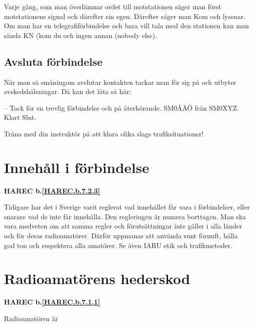Varje gång, som man överlämnar ordet till motstationen
säger man först motstationens signal och därefter sin egen. Därefter
säger man Kom och lyssnar. Om man har en telegrafiförbindelse och bara
vill tala med den stationen kan man sända KN (kom du och ingen annan
(nobody else).

\subsection{Avsluta förbindelse}

När man så småningom avslutar kontakten tackar man för sig på och
utbyter avskedshälsningar. Då kan det låta så här:

-- Tack för en trevlig förbindelse och på återhörande. SM0ÅÄÖ från
SM0XYZ. Klart Slut.

Träna med din instruktör på att klara olika slags trafiksituationer!

\section{Innehåll i förbindelse}
\textbf{HAREC
  b.\ref{HAREC.b.7.2.3}\label{myHAREC.b.7.2.3}
}

Tidigare har det i Sverige varit reglerat vad innehållet får vara i
förbindelser, eller snarare vad de inte får innehålla.
Den regleringen är numera borttagen.
Man ska vara medveten om att samma regler och förutsättningar inte gäller i alla
länder och för deras radioamatörer.
Därför uppmanas att använda sunt förnuft, hålla god ton och respektera alla
amatörer. Se även IARU etik och trafikmetoder.

\section[Hederskod]{Radioamatörens hederskod}
\textbf{HAREC
  b.\ref{HAREC.b.7.1.1}\label{myHAREC.b.7.1.1}
}

Radioamatören är

